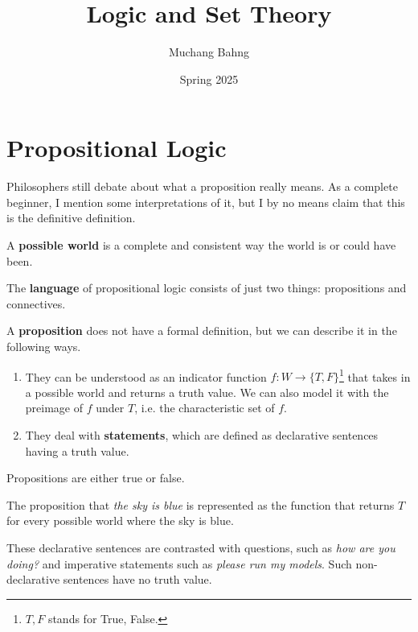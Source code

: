 \documentclass{article}
\begin{document}
\title{Logic and Set Theory}
\author{Muchang Bahng}
\date{Spring 2025}

\maketitle
\tableofcontents
\pagebreak

\section{Propositional Logic} 

    Philosophers still debate about what a proposition really means. As a complete beginner, I mention some interpretations of it, but I by no means claim that this is the definitive definition. 

    \begin{definition}
      A \textbf{possible world} is a complete and consistent way the world is or could have been. 
    \end{definition} 

    The \textbf{language} of propositional logic consists of just two things: propositions and connectives. 

    \begin{definition}[Proposition]
      A \textbf{proposition} does not have a formal definition, but we can describe it in the following ways.  
      \begin{enumerate}
        \item They can be understood as an indicator function $f: W \rightarrow \{T, F\}$\footnote{$T, F$ stands for True, False.} that takes in a possible world and returns a truth value. We can also model it with the preimage of $f$ under $T$, i.e. the characteristic set of $f$. 
        \item They deal with \textbf{statements}, which are defined as declarative sentences having a truth value. 
      \end{enumerate} 
      Propositions are either true or false. 
    \end{definition}

    \begin{example}
      The proposition that \textit{the sky is blue} is represented as the function that returns $T$ for every possible world where the sky is blue. 
    \end{example}

    These declarative sentences are contrasted with questions, such as \textit{how are you doing?} and imperative statements such as \textit{please run my models}. Such non-declarative sentences have no truth value. 
\end{document}
